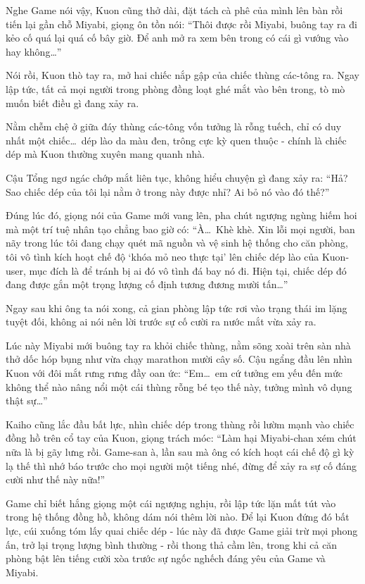 \documentclass[../main.tex]{subfiles}
\begin{document}
Nghe Game nói vậy, Kuon cũng thở dài, đặt tách cà phê của mình lên bàn rồi tiến lại gần chỗ Miyabi, giọng ôn tồn nói: ``Thôi được rồi Miyabi, buông tay ra đi kẻo cố quá lại quá cố bây giờ. Để anh mở ra xem bên trong có cái gì vướng vào hay không\dots''

Nói rồi, Kuon thò tay ra, mở hai chiếc nắp gập của chiếc thùng các-tông ra. Ngay lập tức, tất cả mọi người trong phòng đồng loạt ghé mắt vào bên trong, tò mò muốn biết điều gì đang xảy ra.

Nằm chễm chệ ở giữa đáy thùng các-tông vốn tưởng là rỗng tuếch, chỉ có duy nhất một chiếc\dots\ dép lào da màu đen, trông cực kỳ quen thuộc - chính là chiếc dép mà Kuon thường xuyên mang quanh nhà.

Cậu Tổng ngơ ngác chớp mắt liên tục, không hiểu chuyện gì đang xảy ra: ``Hả? Sao chiếc dép của tôi lại nằm ở trong này được nhỉ? Ai bỏ nó vào đó thế?''

Đúng lúc đó, giọng nói của Game mới vang lên, pha chút ngượng ngùng hiếm hoi mà một trí tuệ nhân tạo chẳng bao giờ có: ``À\dots\ Khè khè. Xin lỗi mọi người, ban nãy trong lúc tôi đang chạy quét mã nguồn và vệ sinh hệ thống cho căn phòng, tôi vô tình kích hoạt chế độ `khóa mỏ neo thực tại' lên chiếc dép lào của Kuon-user, mục đích là để tránh bị ai đó vô tình đá bay nó đi. Hiện tại, chiếc dép đó đang được gắn một trọng lượng cố định tương đương mười tấn\dots''

Ngay sau khi ông ta nói xong, cả gian phòng lập tức rơi vào trạng thái im lặng tuyệt đối, không ai nói nên lời trước sự cố cười ra nước mắt vừa xảy ra.

Lúc này Miyabi mới buông tay ra khỏi chiếc thùng, nằm sõng xoài trên sàn nhà thở dốc hóp bụng như vừa chạy marathon mười cây số. Cậu ngẩng đầu lên nhìn Kuon với đôi mắt rưng rưng đầy oan ức: ``Em\dots\ em cứ tưởng em yếu đến mức không thể nào nâng nổi một cái thùng rỗng bé tẹo thế này, tưởng mình vô dụng thật sự\dots''

Kaiho cũng lắc đầu bất lực, nhìn chiếc dép trong thùng rồi lườm mạnh vào chiếc đồng hồ trên cổ tay của Kuon, giọng trách móc: ``Làm hại Miyabi-chan xém chút nữa là bị gãy lưng rồi. Game-san à, lần sau mà ông có kích hoạt cái chế độ gì kỳ lạ thế thì nhớ báo trước cho mọi người một tiếng nhé, đừng để xảy ra sự cố đáng cười như thế này nữa!''

Game chỉ biết hắng giọng một cái ngượng nghịu, rồi lập tức lặn mất tút vào trong hệ thống đồng hồ, không dám nói thêm lời nào. Để lại Kuon đứng đó bất lực, cúi xuống tóm lấy quai chiếc dép - lúc này đã được Game giải trừ mọi phong ấn, trở lại trọng lượng bình thường - rồi thong thả cầm lên, trong khi cả căn phòng bật lên tiếng cười xòa trước sự ngốc nghếch đáng yêu của Game và Miyabi.
\end{document}
